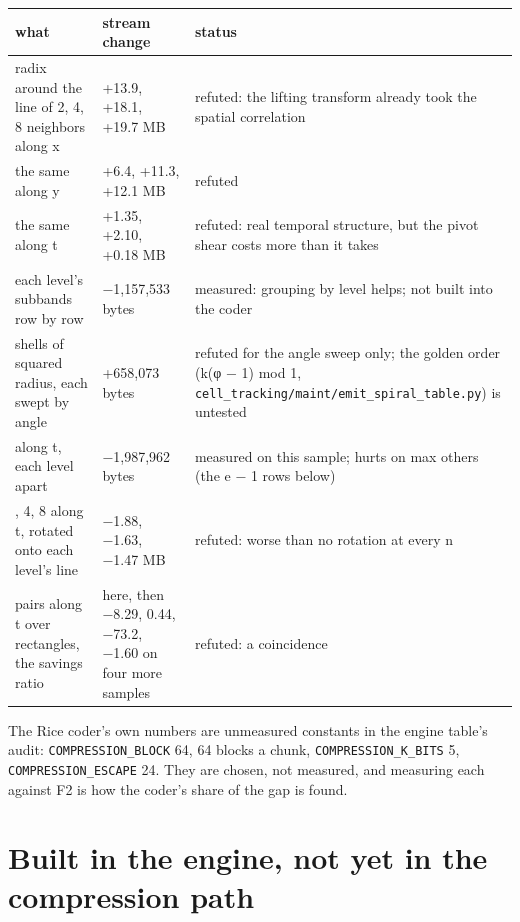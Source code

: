 {\small
\setlength{\tabcolsep}{6pt}
\begin{longtable}{>{\RaggedRight\arraybackslash}p{}>{\RaggedRight\arraybackslash}p{}>{\RaggedRight\arraybackslash}p{}}
\toprule
what & stream change & status \\
\midrule
\endhead
radix around the line of 2, 4, 8 neighbors along x & +13.9, +18.1, +19.7 MB & refuted: the lifting transform already took the spatial correlation \\
the same along y & +6.4, +11.3, +12.1 MB & refuted \\
the same along t & +1.35, +2.10, +0.18 MB & refuted: real temporal structure, but the pivot shear costs more than it takes \\
each level's subbands row by row & −1,157,533 bytes & measured: grouping by level helps; not built into the coder \\
shells of squared radius, each swept by angle & +658,073 bytes & refuted for the angle sweep only; the golden order (k(φ − 1) mod 1, \texttt{cell\_\allowbreak{}tracking/\allowbreak{}maint/\allowbreak{}emit\_\allowbreak{}spiral\_\allowbreak{}table.\allowbreak{}py}) is untested \\
2 along t, each level apart & −1,987,962 bytes & measured on this sample; hurts on max others (the e − 1 rows below) \\
2, 4, 8 along t, rotated onto each level's line & −1.88, −1.63, −1.47 MB & refuted: worse than no rotation at every n \\
pairs along t over rectangles, the savings ratio & 1.7174 here, then −8.29, 0.44, −73.2, −1.60 on four more samples & refuted: a coincidence \\
\bottomrule
\end{longtable}
}

The Rice coder's own numbers are unmeasured constants in the engine table's audit: \texttt{COMPRESSION\_\allowbreak{}BLOCK} 64, 64 blocks a chunk, \texttt{COMPRESSION\_\allowbreak{}K\_\allowbreak{}BITS} 5, \texttt{COMPRESSION\_\allowbreak{}ESCAPE} 24. They are chosen, not measured, and measuring each against F2 is how the coder's share of the gap is found.

\section{\texorpdfstring{Built in the engine, not yet in the compression path}{Built in the engine, not yet in the compression path}}

